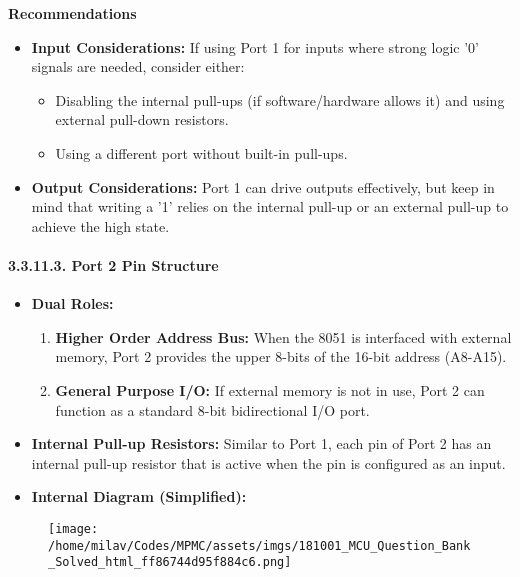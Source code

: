 \documentclass[
]{article}
\begin{document}
\textbf{Recommendations}

\begin{itemize}
\item
  \textbf{Input Considerations:} If using Port 1 for inputs where strong
  logic '0' signals are needed, consider either:

  \begin{itemize}
  \item
    Disabling the internal pull-ups (if software/hardware allows it) and
    using external pull-down resistors.
  \item
    Using a different port without built-in pull-ups.
  \end{itemize}
\item
  \textbf{Output Considerations:} Port 1 can drive outputs effectively,
  but keep in mind that writing a '1' relies on the internal pull-up or
  an external pull-up to achieve the high state.
\end{itemize}

\hypertarget{33113-port-2-pin-structure}{%
\paragraph{3.3.11.3. Port 2 Pin
Structure}\label{33113-port-2-pin-structure}}

\begin{itemize}
\item
  \textbf{Dual Roles:}

  \begin{enumerate}
  \def\labelenumi{\arabic{enumi}.}
  \item
    \textbf{Higher Order Address Bus:} When the 8051 is interfaced with
    external memory, Port 2 provides the upper 8-bits of the 16-bit
    address (A8-A15).
  \item
    \textbf{General Purpose I/O:} If external memory is not in use, Port
    2 can function as a standard 8-bit bidirectional I/O port.
  \end{enumerate}
\item
  \textbf{Internal Pull-up Resistors:} Similar to Port 1, each pin of
  Port 2 has an internal pull-up resistor that is active when the pin is
  configured as an input.
\item
  \textbf{Internal Diagram (Simplified):}
\end{itemize}

\begin{figure}
\centering
\texttt{[image: /home/milav/Codes/MPMC/assets/imgs/181001\_MCU\_Question\_Bank\_Solved\_html\_ff86744d95f884c6.png]}
\caption{}
\end{figure}
\end{document}
